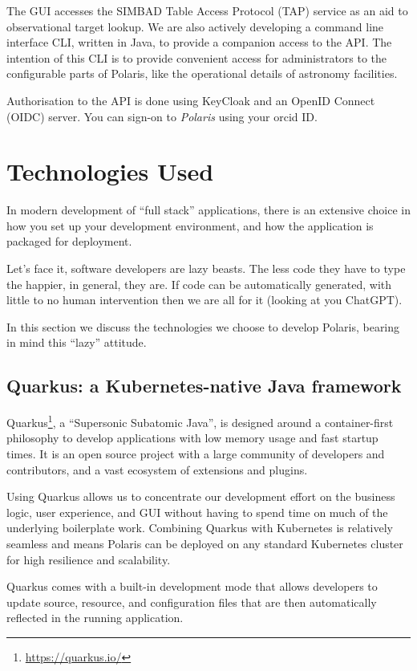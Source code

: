 \documentclass[11pt,twoside]{article}
\begin{document}
The GUI accesses the SIMBAD Table Access Protocol (TAP) service as an aid to observational target lookup.
We are also actively developing a command line interface CLI, written in Java, to provide a companion access to
the API. The intention of this CLI is to provide convenient access for administrators to the configurable parts of
Polaris, like the operational details of astronomy facilities.

Authorisation to the API is done using KeyCloak and an OpenID Connect (OIDC) server.
You can sign-on to \emph{Polaris} using your orcid ID\@.


\section{Technologies Used}\label{sec:technologies-used}

In modern development of ``full stack'' applications, there is an extensive choice in how you set up your
development environment, and how the application is packaged for deployment.

Let's face it, software developers are lazy beasts.
The less code they have to type the happier, in general, they are.
If code can be automatically generated, with little to no human intervention then we are all for it (looking at you
ChatGPT).

In this section we discuss the technologies we choose to develop Polaris, bearing in mind this ``lazy'' attitude.

\subsection{Quarkus: a Kubernetes-native Java framework}\label{subsec:quarkus}

Quarkus\footnote{\url{https://quarkus.io/}}, a ``Supersonic Subatomic Java'', is designed around a
container-first philosophy to develop applications with low memory usage and fast startup times.
It is an open source project with a large community of developers and contributors, and a vast ecosystem
of extensions and plugins.

Using Quarkus allows us to concentrate our development effort on the business logic, user experience, and GUI
without having to spend time on much of the underlying boilerplate work.
Combining Quarkus with Kubernetes is relatively seamless and means Polaris can be deployed on any standard
Kubernetes cluster for high resilience and scalability.

Quarkus comes with a built-in development mode that allows developers to update source, resource, and
configuration files that are then automatically reflected in the running application.
\end{document}
